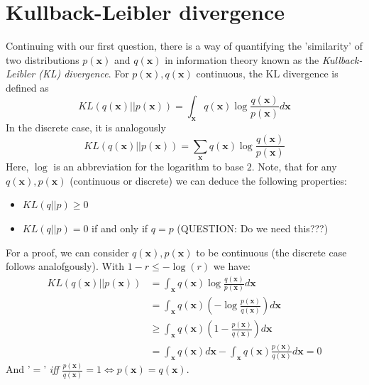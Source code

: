 \documentclass[12pt]{report}
\theoremstyle{definition}
\begin{document}
\section{Kullback-Leibler divergence}
Continuing with our first question, there is a way of quantifying the 'similarity' of two distributions $p(\mathbf{x})$ and $q(\mathbf{x})$ in information theory known as the \emph{Kullback-Leibler (KL) divergence}. For $p(\mathbf{x}), q(\mathbf{x})$ continuous, the KL divergence is defined as %
\begin{equation}
	KL(q(\mathbf{x})||p(\mathbf{x})) = \int_{\mathbf{x}} q(\mathbf{x}) \log \frac{q(\mathbf{x})}{p(\mathbf{x})} d \mathbf{x}
\end{equation}
In the discrete case, it is analogously 
\begin{equation}
	KL(q(\mathbf{x})||p(\mathbf{x})) = \sum_{\mathbf{x}} q(\mathbf{x}) \log \frac{q(\mathbf{x})}{p(\mathbf{x})}
\end{equation}
Here, $\log$ is an abbreviation for the logarithm to base $2$. Note, that for any $q(\mathbf{x}), p(\mathbf{x})$ (continuous or discrete) we can deduce the following properties:
\begin{itemize}
	\item $KL(q||p) \geq 0$
	\item $KL(q||p) = 0$ if and only if $q = p$ (QUESTION: Do we need this???)
\end{itemize}
For a proof, we can consider $q(\mathbf{x}), p(\mathbf{x})$ to be continuous (the discrete case follows analofgously). With $1 - r \leq -\log(r)$ we have:
\begin{equation}
\begin{split}
KL(q(\mathbf{x})||p(\mathbf{x})) 
& = \int_{\mathbf{x}} q(\mathbf{x}) \log \frac{q(\mathbf{x})}{p(\mathbf{x})} d \mathbf{x} \\
& = \int_{\mathbf{x}} q(\mathbf{x}) (- \log \frac{p(\mathbf{x})}{q(\mathbf{x})}) d \mathbf{x} \\
& \geq \int_{\mathbf{x}} q(\mathbf{x}) (1 - \frac{p(\mathbf{x})}{q(\mathbf{x})}) d \mathbf{x} \\
& = \int_{\mathbf{x}} q(\mathbf{x}) d \mathbf{x} - \int_{\mathbf{x}} q(\mathbf{x}) \frac{p(\mathbf{x})}{q(\mathbf{x})} d \mathbf{x} = 0 
\end{split}
\end{equation}
And '$=$' \emph{iff}  $\frac{p(\mathbf{x})}{q(\mathbf{x})} = 1 \Leftrightarrow p(\mathbf{x})=q(\mathbf{x})$.
\end{document}
